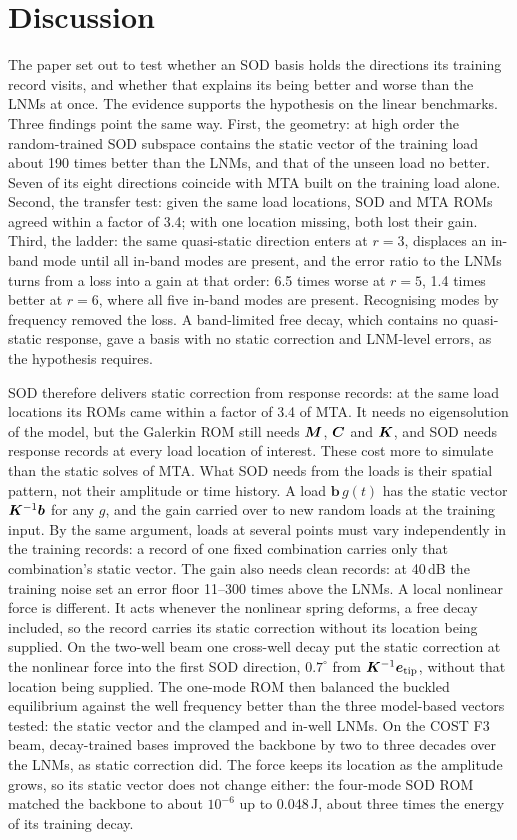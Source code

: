 \documentclass[preprint,12pt]{elsarticle}
\begin{document}
\section{Discussion}\label{sec:disc}
The paper set out to test whether an SOD basis holds the directions its training record visits, and whether that explains its being better and worse than the LNMs at once.
The evidence supports the hypothesis on the linear benchmarks. Three findings point the same way.
First, the geometry: at high order the random-trained SOD subspace contains the static vector of the training load about 190 times better than the LNMs, and that of the unseen load no better. Seven of its eight directions coincide with MTA built on the training load alone.
Second, the transfer test: given the same load locations, SOD and MTA ROMs agreed within a factor of 3.4; with one location missing, both lost their gain.
Third, the ladder: the same quasi-static direction enters at $r=3$, displaces an in-band mode until all in-band modes are present, and the error ratio to the LNMs turns from a loss into a gain at that order: 6.5 times worse at $r=5$, 1.4 times better at $r=6$, where all five in-band modes are present. Recognising modes by frequency removed the loss.
A band-limited free decay, which contains no quasi-static response, gave a basis with no static correction and LNM-level errors, as the hypothesis requires.

SOD therefore delivers static correction from response records: at the same load locations its ROMs came within a factor of 3.4 of MTA. It needs no eigensolution of the model, but the Galerkin ROM still needs $\bm{M}$, $\bm{C}$ and $\bm{K}$, and SOD needs response records at every load location of interest. These cost more to simulate than the static solves of MTA.
What SOD needs from the loads is their spatial pattern, not their amplitude or time history. A load $\bm{b}\,g(t)$ has the static vector $\bm{K}^{-1}\bm{b}$ for any $g$, and the gain carried over to new random loads at the training input. By the same argument, loads at several points must vary independently in the training records: a record of one fixed combination carries only that combination's static vector. The gain also needs clean records: at 40\,dB the training noise set an error floor 11--300 times above the LNMs.
A local nonlinear force is different. It acts whenever the nonlinear spring deforms, a free decay included, so the record carries its static correction without its location being supplied. On the two-well beam one cross-well decay put the static correction at the nonlinear force into the first SOD direction, $0.7^\circ$ from $\bm{K}^{-1}\bm{e}_{\mathrm{tip}}$, without that location being supplied. The one-mode ROM then balanced the buckled equilibrium against the well frequency better than the three model-based vectors tested: the static vector and the clamped and in-well LNMs. On the COST F3 beam, decay-trained bases improved the backbone by two to three decades over the LNMs, as static correction did. The force keeps its location as the amplitude grows, so its static vector does not change either: the four-mode SOD ROM matched the backbone to about $10^{-6}$ up to 0.048\,J, about three times the energy of its training decay.
\end{document}
